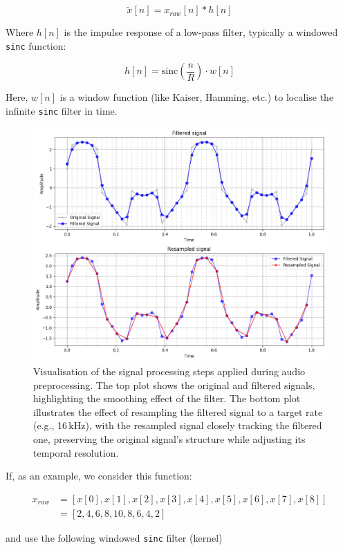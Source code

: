 \documentclass[conference]{IEEEtran}
\begin{document}
	$$\tilde{x}[n] = x_{raw}[n] * h[n]$$
	
	Where $h[n]$ is the impulse response of a low-pass filter, typically a windowed \texttt{sinc} function:
	
	$$h[n] = \text{sinc}\left(\frac{n}{R}\right) \cdot w[n]$$
	
	Here, $w[n]$ is a window function (like Kaiser, Hamming, etc.) to localise the infinite \texttt{sinc} filter in time.
	
	\begin{figure}[H]
		\centering
		\includegraphics[width=1\linewidth]{img/img-resampling}
		\caption{Visualisation of the signal processing steps applied during audio preprocessing. The top plot shows the original and filtered signals, highlighting the smoothing effect of the filter. The bottom plot illustrates the effect of resampling the filtered signal to a target rate (e.g., 16\,kHz), with the resampled signal closely tracking the filtered one, preserving the original signal's structure while adjusting its temporal resolution.}
		\label{fig:img-resampling}
	\end{figure}
	
	If, as an example, we consider this function:
	
	\begin{align*}
		x_{raw} &=[x[0], x[1], x[2], x[3], x[4], x[5], x[6], x[7], x[8]]\\
		&=[2, 4, 6, 8, 10, 8, 6, 4, 2]
	\end{align*}
	
	and use the following windowed \texttt{sinc} filter (kernel)
	
\end{document}
